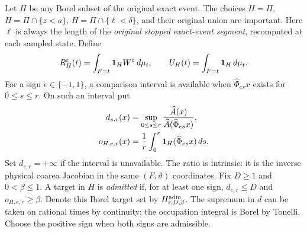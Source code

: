Let $H$ be any Borel subset of the original exact event. The choices
$H=\Pi$, $H=\Pi\cap\{z<a\}$, $H=\Pi\cap\{\ell<\delta\}$,
and their original union are important. Here $\ell$ is always the
length of the \emph{original stopped exact-event segment}, recomputed
at each sampled state. Define
\[
 R_H^\varepsilon(t)=\int_{F=t}\mathbf1_H W^\varepsilon\,d\mu_t,
 \qquad U_H(t)=\int_{F=t}\mathbf1_H\,d\mu_t.
\]
For a sign $e\in\{-1,1\}$, a comparison interval is available when
$\widehat\Phi_{es}x$ exists for $0\le s\le r$. On such an interval put
\begin{align}
 d_{e,r}(x)&=\sup_{0\le s\le r}
 \frac{\widehat A(x)}{\widehat A(\widehat\Phi_{es}x)},\notag\\
 o_{H,e,r}(x)&=\frac1r\int_0^r
                         \one_H(\widehat\Phi_{es}x)\,ds.
                                      \label{eq:v96-tests}
\end{align}
Set $d_{e,r}=+\infty$ if the interval is unavailable. The ratio is
intrinsic: it is the inverse physical coarea Jacobian in the same
$(F,\vartheta)$ coordinates. Fix $D\ge1$ and $0<\beta\le1$.
A target in $H$ is \emph{admitted} if, for at least one sign,
$d_{e,r}\le D$ and $o_{H,e,r}\ge\beta$. Denote this Borel target
set by $H^{\rm adm}_{r,D,\beta}$. The supremum in $d$ can be taken
on rational times by continuity; the occupation integral is Borel by
Tonelli. Choose the positive sign when both signs are admissible.

